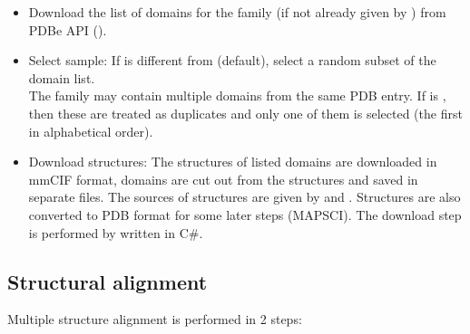 \documentclass{article}
\begin{document}
\begin{itemize}
  \item
    Download the list of domains for the family (if not already given by
    ) from PDBe API
    ().
  \item
    Select sample: If  is different from
     (default), select a random subset of the domain list.\\
    The family may contain multiple domains from the same PDB entry. If
     is , then
    these are treated as duplicates and only one of them is selected (the
    first in alphabetical order).
  \item
    Download structures: The structures of listed domains are downloaded
    in mmCIF format, domains are cut out from the structures and saved in
    separate files. The sources of structures are given by
     and
    . Structures are also
    converted to PDB format for some later steps (MAPSCI). The download
    step is performed by  written in C\#.
  \end{itemize}
  


\subsection{Structural alignment}

Multiple structure alignment is performed in 2 steps:
\end{document}
